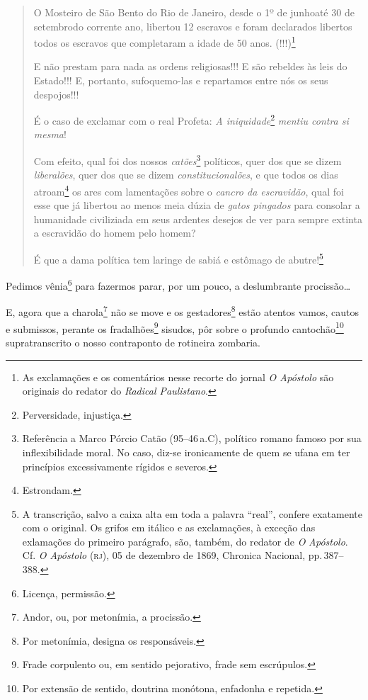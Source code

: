 \begin{quote}
O Mosteiro de São Bento do Rio de Janeiro, desde o 1º de junhoaté 30 de
setembrodo corrente ano, libertou 12 escravos e foram declarados
libertos todos os escravos que completaram a idade de 50 anos.
(!!!)\footnote{ As exclamações e os comentários nesse recorte do jornal
  \emph{O Apóstolo} são originais do redator do \emph{Radical
  Paulistano}.}

E não prestam para nada as ordens religiosas!!! E são rebeldes às leis
do Estado!!! E, portanto, sufoquemo-las e repartamos entre nós os seus
despojos!!!

É o caso de exclamar com o real Profeta: \emph{A iniquidade}\footnote{
  Perversidade, injustiça.} \emph{mentiu contra si mesma}!

Com efeito, qual foi dos nossos \emph{catões}\footnote{ Referência a
  Marco Pórcio Catão (95--46\,a.C), político romano famoso por sua
  inflexibilidade moral. No caso, diz-se ironicamente de quem se ufana
  em ter princípios excessivamente rígidos e severos.} políticos, quer
dos que se dizem \emph{liberalões}, quer dos que se dizem
\emph{constitucionalões}, e que todos os dias atroam\footnote{
  Estrondam.} os ares com lamentações sobre o \emph{cancro da
escravidão}, qual foi esse que já libertou ao menos meia dúzia de
\emph{gatos pingados} para consolar a humanidade civiliziada em seus
ardentes desejos de ver para sempre extinta a escravidão do homem pelo
homem?

É que a dama política tem laringe de sabiá e estômago de
abutre!\footnote{ A transcrição, salvo a caixa alta em toda a palavra
  ``real'', confere exatamente com o original. Os grifos em itálico e as
  exclamações, à exceção das exlamações do primeiro parágrafo, são,
  também, do redator de \emph{O} \emph{Apóstolo}. Cf. \emph{O Apóstolo}
  (\textsc{rj}), 05 de dezembro de 1869, Chronica Nacional, pp.\,387--388.}
\end{quote}  

Pedimos vênia\footnote{ Licença, permissão.} para fazermos parar, por
um pouco, a deslumbrante procissão\ldots{}

E, agora que a charola\footnote{ Andor, ou, por metonímia, a procissão.}
não se move e os gestadores\footnote{ Por metonímia, designa os
  responsáveis.} estão atentos vamos, cautos e submissos, perante os
fradalhões\footnote{ Frade corpulento ou, em sentido pejorativo, frade
  sem escrúpulos.} sisudos, pôr sobre o profundo cantochão\footnote{
  Por extensão de sentido, doutrina monótona, enfadonha e repetida.}
supratranscrito o nosso contraponto de rotineira zombaria.

